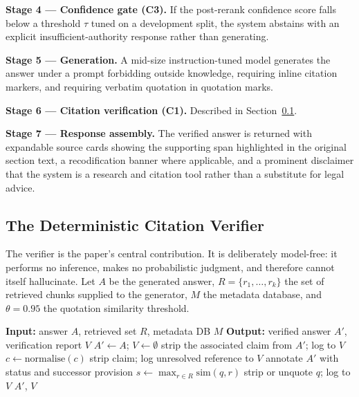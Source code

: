 \documentclass[conference]{IEEEtran}
\begin{document}
\textbf{Stage 4 --- Confidence gate (C3).} If the post-rerank confidence score falls below a threshold $\tau$ tuned on a development split, the system abstains with an explicit insufficient-authority response rather than generating.

\textbf{Stage 5 --- Generation.} A mid-size instruction-tuned model generates the answer under a prompt forbidding outside knowledge, requiring inline citation markers, and requiring verbatim quotation in quotation marks.

\textbf{Stage 6 --- Citation verification (C1).} Described in Section~\ref{sec:verifier}.

\textbf{Stage 7 --- Response assembly.} The verified answer is returned with expandable source cards showing the supporting span highlighted in the original section text, a recodification banner where applicable, and a prominent disclaimer that the system is a research and citation tool rather than a substitute for legal advice.

\subsection{The Deterministic Citation Verifier}
\label{sec:verifier}

The verifier is the paper's central contribution. It is deliberately model-free: it performs no inference, makes no probabilistic judgment, and therefore cannot itself hallucinate. Let $A$ be the generated answer, $R = \{r_1,\dots,r_k\}$ the set of retrieved chunks supplied to the generator, $M$ the metadata database, and $\theta = 0.95$ the quotation similarity threshold.

\begin{algorithmic}[1]
\STATE \textbf{Input:} answer $A$, retrieved set $R$, metadata DB $M$
\STATE \textbf{Output:} verified answer $A'$, verification report $V$
\STATE $A' \leftarrow A$; $V \leftarrow \emptyset$
        \STATE strip the associated claim from $A'$; log to $V$
    \ENDIF
\ENDFOR
{}
    \STATE $c \leftarrow \mathrm{normalise}(c)$
        \STATE strip claim; log unresolved reference to $V$
    \ELSE
            \STATE annotate $A'$ with status and successor provision
        \ENDIF
    \ENDIF
\ENDFOR
{}
    \STATE $s \leftarrow \max_{r \in R} \mathrm{sim}(q, r)$
        \STATE strip or unquote $q$; log to $V$
    \ENDIF
\ENDFOR
\RETURN $A'$, $V$
\end{algorithmic}
\end{document}

